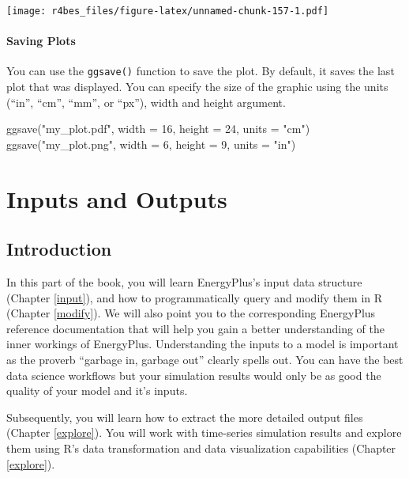 \documentclass[
]{book}
\newenvironment{Shaded}{\begin{snugshade}}{\end{snugshade}}
\newcommand{\AttributeTok}[1]{\textcolor[rgb]{0.77,0.63,0.00}{#1}}
\newcommand{\DecValTok}[1]{\textcolor[rgb]{0.00,0.00,0.81}{#1}}
\newcommand{\FunctionTok}[1]{\textcolor[rgb]{0.00,0.00,0.00}{#1}}
\newcommand{\NormalTok}[1]{#1}
\newcommand{\StringTok}[1]{\textcolor[rgb]{0.31,0.60,0.02}{#1}}
\begin{document}
\texttt{[image: r4bes\_files/figure-latex/unnamed-chunk-157-1.pdf]}

\hypertarget{saving-plots}{%
\subsection{Saving Plots}\label{saving-plots}}

You can use the \texttt{ggsave()} function to save the plot. By default, it saves the last plot that was displayed. You can specify the size of the graphic using the units (``in'', ``cm'', ``mm'', or ``px''), width and height argument.

\begin{Shaded}
\begin{Highlighting}[]
\FunctionTok{ggsave}\NormalTok{(}\StringTok{"my\_plot.pdf"}\NormalTok{, }\AttributeTok{width =} \DecValTok{16}\NormalTok{, }\AttributeTok{height =} \DecValTok{24}\NormalTok{, }\AttributeTok{units =} \StringTok{"cm"}\NormalTok{)}
\FunctionTok{ggsave}\NormalTok{(}\StringTok{"my\_plot.png"}\NormalTok{, }\AttributeTok{width =} \DecValTok{6}\NormalTok{, }\AttributeTok{height =} \DecValTok{9}\NormalTok{, }\AttributeTok{units =} \StringTok{"in"}\NormalTok{)}
\end{Highlighting}
\end{Shaded}

\hypertarget{part-inputs-and-outputs}{%
\part{Inputs and Outputs}\label{part-inputs-and-outputs}}

\hypertarget{input-output}{%
\chapter{Introduction}\label{input-output}}

In this part of the book, you will learn EnergyPlus's input data structure (Chapter \ref{input}), and how to programmatically query and modify them in R (Chapter \ref{modify}). We will also point you to the corresponding EnergyPlus reference documentation that will help you gain a better understanding of the inner workings of EnergyPlus. Understanding the inputs to a model is important as the proverb ``garbage in, garbage out'' clearly spells out. You can have the best data science workflows but your simulation results would only be as good the quality of your model and it's inputs.

Subsequently, you will learn how to extract the more detailed output files (Chapter \ref{explore}). You will work with time-series simulation results and explore them using R's data transformation and data visualization capabilities (Chapter \ref{explore}).
\end{document}

